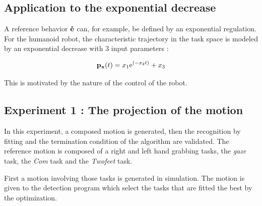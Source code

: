 \documentclass[letterpaper, 10pt, conference]{ieeeconf}      %
\begin{document}
\subsection{Application to the exponential decrease}
A reference behavior ${\mathbf{\dot{e}}}$ can, for example, be defined by an exponential regulation.
For the humanoid robot, the characteristic trajectory in the task
space is modeled by an
exponential decrease with 3 input parameters :

\begin{equation}
{\mathbf{p}}_{{\mathbf{x}}}(t) = x_1 \mathrm{e}^{(-x_2 t)} + x_3
\label{eqTask}
\end{equation}

This is motivated by the nature of the control of the
robot.\\

\subsection{Experiment 1 : The projection of the motion}
In this experiment, a composed motion is generated, then the recognition by fitting
and the termination condition of the algorithm are validated.
The reference motion is composed of a right and left hand grabbing tasks,
the \emph{gaze} task, the \emph{Com} task and the \emph{Twofeet} task.

First a motion involving those tasks is generated in simulation.
The motion is given to the detection program
which select the tasks that are fitted the best by the optimization.
\end{document}
